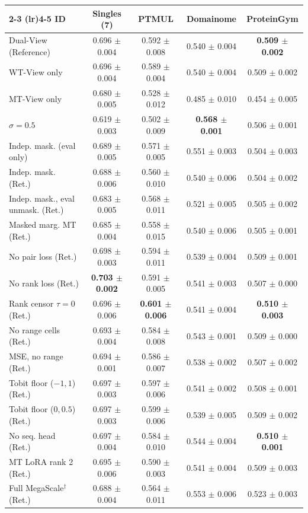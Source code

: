 \begin{table}[H]
{\begin{tabular}{lcccc}
\cmidrule(lr){2-3} \cmidrule(lr){4-5}
ID & Singles (7) & PTMUL & Domainome & ProteinGym \\
\midrule
Dual-View (Reference) & 0.696 $\pm$ 0.004 & 0.592 $\pm$ 0.008 & 0.540 $\pm$ 0.004 & \textbf{0.509 $\pm$ 0.002} \\
WT-View only & 0.696 $\pm$ 0.004 & 0.589 $\pm$ 0.004 & 0.540 $\pm$ 0.004 & 0.509 $\pm$ 0.002 \\
MT-View only & 0.680 $\pm$ 0.005 & 0.528 $\pm$ 0.012 & 0.485 $\pm$ 0.010 & 0.454 $\pm$ 0.005 \\
$\sigma=0.5$ & 0.619 $\pm$ 0.003 & 0.502 $\pm$ 0.009 & \textbf{0.568 $\pm$ 0.001} & 0.506 $\pm$ 0.001 \\
Indep. mask. (eval only) & 0.689 $\pm$ 0.005 & 0.571 $\pm$ 0.005 & 0.551 $\pm$ 0.003 & 0.504 $\pm$ 0.003 \\
Indep. mask. (Ret.) & 0.688 $\pm$ 0.006 & 0.560 $\pm$ 0.010 & 0.540 $\pm$ 0.006 & 0.504 $\pm$ 0.002 \\
Indep. mask., eval unmask. (Ret.) & 0.683 $\pm$ 0.005 & 0.568 $\pm$ 0.011 & 0.521 $\pm$ 0.005 & 0.505 $\pm$ 0.002 \\
Masked marg. MT (Ret.) & 0.685 $\pm$ 0.004 & 0.558 $\pm$ 0.015 & 0.540 $\pm$ 0.006 & 0.505 $\pm$ 0.001 \\
No pair loss (Ret.) & 0.698 $\pm$ 0.003 & 0.594 $\pm$ 0.011 & 0.539 $\pm$ 0.004 & 0.509 $\pm$ 0.001 \\
No rank loss (Ret.) & \textbf{0.703 $\pm$ 0.002} & 0.591 $\pm$ 0.005 & 0.541 $\pm$ 0.003 & 0.507 $\pm$ 0.000 \\
Rank censor $\tau=0$ (Ret.) & 0.696 $\pm$ 0.006 & \textbf{0.601 $\pm$ 0.006} & 0.541 $\pm$ 0.004 & \textbf{0.510 $\pm$ 0.003} \\
No range cells (Ret.) & 0.693 $\pm$ 0.004 & 0.584 $\pm$ 0.008 & 0.543 $\pm$ 0.001 & 0.509 $\pm$ 0.000 \\
MSE, no range (Ret.) & 0.694 $\pm$ 0.001 & 0.586 $\pm$ 0.007 & 0.538 $\pm$ 0.002 & 0.507 $\pm$ 0.002 \\
Tobit floor ($-1, 1$) (Ret.) & 0.697 $\pm$ 0.003 & 0.597 $\pm$ 0.006 & 0.541 $\pm$ 0.002 & 0.508 $\pm$ 0.001 \\
Tobit floor ($0, 0.5$) (Ret.) & 0.697 $\pm$ 0.003 & 0.599 $\pm$ 0.006 & 0.539 $\pm$ 0.005 & 0.509 $\pm$ 0.002 \\
No seq. head (Ret.) & 0.697 $\pm$ 0.004 & 0.584 $\pm$ 0.010 & 0.544 $\pm$ 0.004 & \textbf{0.510 $\pm$ 0.001} \\
MT LoRA rank 2 (Ret.) & 0.695 $\pm$ 0.006 & 0.590 $\pm$ 0.003 & 0.541 $\pm$ 0.004 & 0.509 $\pm$ 0.003 \\
Full MegaScale$^\dagger$ (Ret.) & 0.688 $\pm$ 0.004 & 0.564 $\pm$ 0.011 & 0.553 $\pm$ 0.006 & 0.523 $\pm$ 0.003 \\
\bottomrule
\end{tabular}
}
\end{table}



